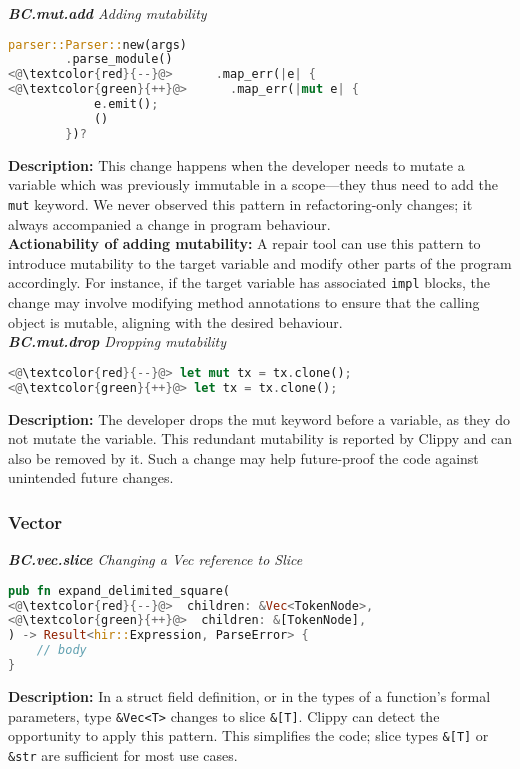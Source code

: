 \noindent\textit{\textbf{BC.mut.add} Adding mutability}

\begin{lstlisting}[language=Rust, style=colouredRust]
parser::Parser::new(args)
        .parse_module()
<@\textcolor{red}{--}@>      .map_err(|e| {
<@\textcolor{green}{++}@>      .map_err(|mut e| {
            e.emit();
            ()
        })?
\end{lstlisting}

\noindent\textbf{Description:} This change happens when the developer needs to mutate a variable which was previously immutable in a scope---they thus need to add the \verb+mut+ keyword. We never observed this pattern in refactoring-only changes; it always accompanied a change in program behaviour. \\

\noindent\textbf{Actionability of adding mutability:} A repair tool can use this pattern to introduce mutability to the target variable and modify other parts of the program accordingly. For instance, if the target variable has associated \texttt{impl} blocks, the change may involve modifying method annotations to ensure that the calling object is mutable, aligning with the desired behaviour.\\


\noindent\textit{\textbf{BC.mut.drop} Dropping mutability}

\begin{lstlisting}[language=Rust, style=colouredRust]
<@\textcolor{red}{--}@> let mut tx = tx.clone();
<@\textcolor{green}{++}@> let tx = tx.clone();
\end{lstlisting}

\noindent\textbf{Description:} The developer drops the mut keyword before a variable, as they do not mutate the variable. This redundant mutability is reported by Clippy and can also be removed by it. Such a change may help future-proof the code against unintended future changes.

\subsubsection{Vector}

\noindent\textit{\textbf{BC.vec.slice} Changing a Vec reference to Slice}

\begin{lstlisting}[language=Rust, style=colouredRust]
pub fn expand_delimited_square(
<@\textcolor{red}{--}@>  children: &Vec<TokenNode>,
<@\textcolor{green}{++}@>  children: &[TokenNode],
) -> Result<hir::Expression, ParseError> {
    // body
}
\end{lstlisting}
\noindent\textbf{Description:} In a struct field definition, or in the types of a function's formal parameters, type \verb+&Vec<T>+ changes to slice \verb+&[T]+. Clippy can detect the opportunity to apply this pattern. This simplifies the code; slice types \verb+&[T]+ or \verb+&str+ are sufficient for most use cases. 

